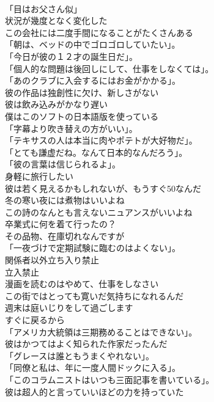 \documentclass[8pt]{extreport}
\begin{document}
\begin{CJK}{UTF8}{min}
\\	「目はお父さん似」	
\\	状況が幾度となく変化した	
\\	この会社には二度手間になることがたくさんある	
\\	「朝は、ベッドの中でゴロゴロしていたい」。	
\\	「今日が彼の１２才の誕生日だ」。	
\\	「個人的な問題は後回しにして、仕事をしなくては」。	
\\	「あのクラブに入会するにはお金がかかる」。	
\\	彼の作品は独創性に欠け、新しさがない	
\\	彼は飲み込みがかなり遅い	
\\	僕はこのソフトの日本語版を使っている	
\\	「字幕より吹き替えの方がいい」。	
\\	「テキサスの人は本当に肉やポテトが大好物だ」。	
\\	「とても謙虚だね。なんて日本的なんだろう」。	
\\	「彼の言葉は信じられるよ」。	
\\	身軽に旅行したい	
\\	彼は若く見えるかもしれないが、もうすぐ50なんだ	
\\	冬の寒い夜には煮物はいいよね	
\\	この詩のなんとも言えないニュアンスがいいよね	
\\	卒業式に何を着て行ったの？	
\\	その品物、在庫切れなんですが	
\\	「一夜づけで定期試験に臨むのはよくない」。	
\\	関係者以外立ち入り禁止	
\\	立入禁止	
\\	漫画を読むのはやめて、仕事をしなさい	
\\	この街ではとっても寛いだ気持ちになれるんだ	
\\	週末は庭いじりをして過ごします	
\\	すぐに戻るから	
\\	「アメリカ大統領は三期務めることはできない」。	
\\	彼はかつてはよく知られた作家だったんだ	
\\	「グレースは誰ともうまくやれない」。	
\\	「同僚と私は、年に一度人間ドックに入る」。	
\\	「このコラムニストはいつも三面記事を書いている」。	
\\	彼は超人的と言っていいほどの力を持っていた	

\end{CJK}
\end{document}

